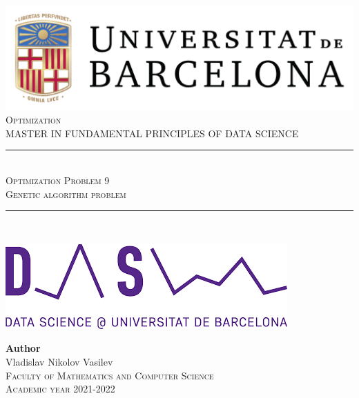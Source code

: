 \documentclass[11pt]{article}
\newcommand{\subject}{Optimization}
\newcommand{\autor}{Vladislav Nikolov Vasilev}
\newcommand{\titulo}{Optimization Problem 9}
\newcommand{\subtitulo}{Genetic algorithm problem}
\newcommand{\masters}{Master in Fundamental Principles of Data Science}
\begin{document}
    

\begin{titlepage}
  \begin{minipage}{\textwidth}
    \centering
    \includegraphics[scale=0.25]{img/ub-logo}\\[2cm]
    
    \textsc{\Large \subject\\[0.5cm]}
    \textsc{\uppercase\expandafter{\masters}}\\[1.5cm]
    
    \noindent\rule[-1ex]{\textwidth}{1pt}\\[1.5ex]
    \textsc{{\Huge \titulo\\[0.5ex]}}
    \textsc{{\Large \subtitulo\\}}
    \noindent\rule[-1ex]{\textwidth}{2pt}\\[3.5ex]
  \end{minipage}
  
  \vspace{2cm}
  
  \begin{minipage}{\textwidth}
    \centering
    
    \includegraphics[scale=0.4]{img/ub-ds-logo}
    \vspace{2cm}
    
    \textbf{Author}\\ {\autor{}}\\[2.5ex]
    \textsc{Faculty of Mathematics and Computer Science}\\
    \vspace{1em}
    \textsc{Academic year 2021-2022}
  \end{minipage}
\end{titlepage}
\end{document}
